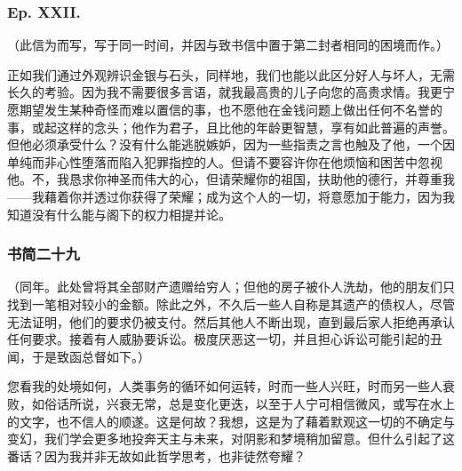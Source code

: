 
\subsubsection{Ep. XXII.}

（此信为而写，写于同一时间，并因与致书信中置于第二封者相同的困境而作。）\par

正如我们通过外观辨识金银与石头，同样地，我们也能以此区分好人与坏人，无需长久的考验。因为我不需要很多言语，就我最高贵的儿子向您的高贵求情。我更宁愿期望发生某种奇怪而难以置信的事，也不愿他在金钱问题上做出任何不名誉的事，或起这样的念头；他作为君子，且比他的年龄更智慧，享有如此普遍的声誉。但他必须承受什么？没有什么能逃脱嫉妒，因为一些指责之言也触及了他，一个因单纯而非心性堕落而陷入犯罪指控的人。但请不要容许你在他烦恼和困苦中忽视他。不，我恳求你神圣而伟大的心，但请荣耀你的祖国，扶助他的德行，并尊重我——我藉着你并透过你获得了荣耀；成为这个人的一切，将意愿加于能力，因为我知道没有什么能与阁下的权力相提并论。\par


\subsubsection{书简二十九}

（同年。此处曾将其全部财产遗赠给穷人；但他的房子被仆人洗劫，他的朋友们只找到一笔相对较小的金额。除此之外，不久后一些人自称是其遗产的债权人，尽管无法证明，他们的要求仍被支付。然后其他人不断出现，直到最后家人拒绝再承认任何要求。接着有人威胁要诉讼。极度厌恶这一切，并且担心诉讼可能引起的丑闻，于是致函总督如下。）\par

您看我的处境如何，人类事务的循环如何运转，时而一些人兴旺，时而另一些人衰败，如俗话所说，兴衰无常，总是变化更迭，以至于人宁可相信微风，或写在水上的文字，也不信人的顺遂。这是何故？我想，这是为了藉着默观这一切的不确定与变幻，我们学会更多地投奔天主与未来，对阴影和梦境稍加留意。但什么引起了这番话？因为我并非无故如此哲学思考，也非徒然夸耀？\par

